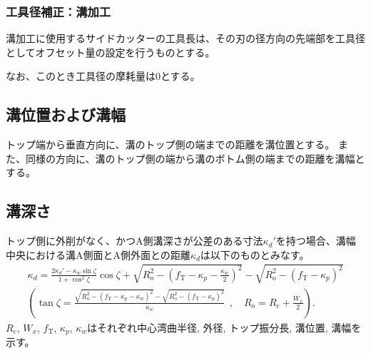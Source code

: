 \subsubsection{工具径補正：溝加工}
溝加工に使用するサイドカッターの工具長は、その刃の径方向の先端部を工具径としてオフセット量の設定を行うものとする。

なお、このとき工具径の摩耗量は0とする。


\subsection{溝位置および溝幅}
トップ端から垂直方向に、溝のトップ側の端までの距離を溝位置とする。
また、同様の方向に、溝のトップ側の端から溝のボトム側の端までの距離を溝幅とする。


\subsection{溝深さ}
トップ側に外削がなく、かつA側溝深さが公差のある寸法$\kappa_d'$を持つ場合、溝幅中央における溝A側面とA側外面との距離$\kappa_d$は以下のものとみなす。
\begin{gather*}
  \kappa_d
  = \frac{2\kappa_d'-\kappa_w\sin\zeta}{1+\cos^2\zeta}\cos\zeta
    +\sqrt{R_\mathrm o^2-\left(f_\mathrm T-\kappa_p-\frac{\kappa_w}2\right)^2}
    -\sqrt{R_\mathrm o^2-\left(f_\mathrm T-\kappa_p\right)^2}\\[3pt]
  \left(
  \tan\zeta
  = \frac{\sqrt{R_\mathrm o^2-\left(f_\mathrm T-\kappa_p-\kappa_w\right)^2}
          -\sqrt{R_\mathrm o^2-\left(f_\mathrm T-\kappa_p\right)^2}}
         {\kappa_w}
    ~~, \quad
    R_\mathrm o = R_\mathrm c+\frac{W_x}2
  \right).
\end{gather*}
$R_\mathrm c$, $W_x$, $f_\mathrm T$, $\kappa_p$, $\kappa_w$はそれぞれ中心湾曲半径, 外径, トップ振分長, 溝位置, 溝幅を示す。

